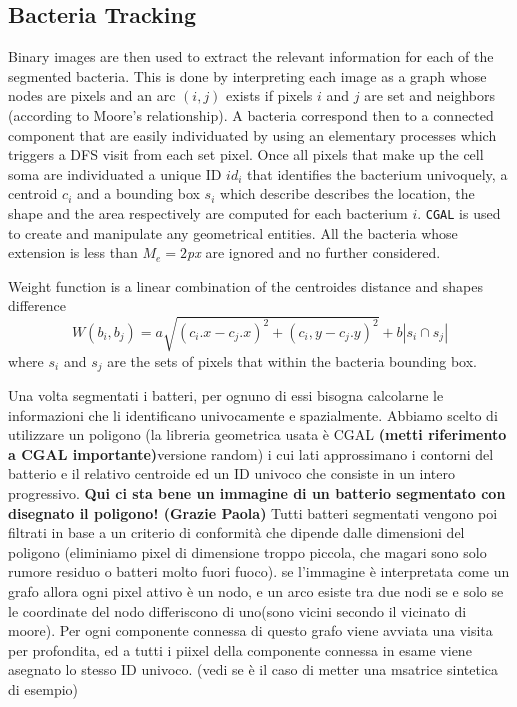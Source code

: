\documentclass[conference]{IEEEtran}
\begin{document}
\subsection{Bacteria Tracking}
\label{ciao}
Binary images are then used to extract the relevant information for each of the segmented bacteria. This is done by interpreting each image as a graph whose nodes are pixels and an arc $(i,j)$ exists if pixels $i$ and $j$ are set and neighbors (according to Moore's relationship). A bacteria correspond then to a connected component that are easily individuated by using an elementary processes which triggers a DFS visit from each set pixel. Once all pixels that make up the cell soma are individuated a unique ID $id_i$ that  identifies the bacterium univoquely, a centroid $c_i$ and a bounding box $s_i$ which describe describes the location, the shape and the area respectively are computed for each bacterium $i$. \texttt{CGAL} \cite{CGAL} is used to create and manipulate any geometrical entities. All the bacteria whose extension is less than $M_e = 2$\textit{px} are ignored and no further considered.

Weight function is a linear combination of the centroides distance and shapes difference 
\begin{equation*}
\label{sec:bacttracking}
W(b_i,b_j) = a \sqrt{(c_i.x - c_j.x)^2 + (c_i,y-c_j.y)^2} + b |s_i \cap s_j|
\end{equation*}
where $s_i$ and $s_j$ are the sets of pixels that within the bacteria bounding box.

 Una volta segmentati  i batteri, per ognuno di essi bisogna calcolarne le informazioni che li identificano univocamente e spazialmente. Abbiamo scelto di utilizzare un poligono (la libreria geometrica usata è CGAL \textbf{(metti riferimento a CGAL importante)}versione random) i cui lati approssimano i contorni del batterio e il relativo centroide ed un ID  univoco che consiste in un intero progressivo. \textbf{Qui ci sta bene un immagine di un batterio segmentato con disegnato il poligono! (Grazie Paola)}
 Tutti batteri segmentati vengono poi filtrati in base a un criterio di conformità che dipende dalle dimensioni del poligono (eliminiamo pixel di dimensione troppo piccola, che magari sono solo rumore residuo o batteri molto fuori fuoco). se l'immagine è interpretata come un grafo allora ogni pixel attivo è un nodo, e  un arco esiste tra due nodi se e solo se le coordinate del nodo differiscono di uno(sono vicini secondo il vicinato di moore). Per ogni componente connessa di questo grafo viene avviata una visita per profondita, ed a tutti i piixel della componente connessa in esame viene asegnato lo stesso ID univoco. (vedi se è il caso di metter una msatrice sintetica di esempio)
\end{document}
